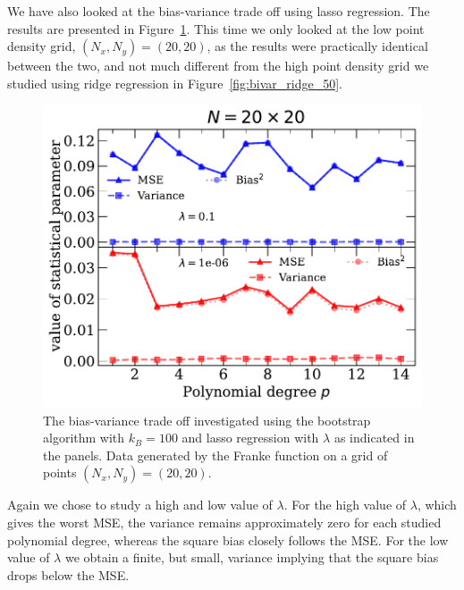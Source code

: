 \documentclass[a4paper, 
amsfonts, 
amssymb, 
amsmath, 
reprint, 
showkeys, 
nofootinbib, 
twoside]{revtex4-2}
\begin{document}
We have also looked at the bias-variance trade off using lasso regression. The results are presented in Figure~\ref{fig:bivar_lasso}. This time we only looked at the low point density grid,  $(N_x,N_y) = (20, 20)$, as the results were practically identical between the two, and not much different from the high point density grid we studied using ridge regression in Figure~\ref{fig:bivar_ridge_50}.  
\begin{figure} [h!]
    \centering
    \includegraphics[width = \columnwidth]{Figures/biasvar_lasso_n20.pdf}
    \caption{The bias-variance trade off investigated using the bootstrap algorithm with $k_B = 100$ and lasso regression with $\lambda$ as indicated in the panels. Data generated by the Franke function on a grid of points $(N_x, N_y) = (20,20)$.}
    \label{fig:bivar_lasso}
\end{figure}
Again we chose to study a high and low value of $\lambda$. For the high value of $\lambda$, which gives the worst MSE, the variance remains approximately zero for each studied polynomial degree, whereas the square bias closely follows the MSE. For the low value of $\lambda$ we obtain a finite, but small, variance implying that the square bias drops below the MSE. 
\end{document}

